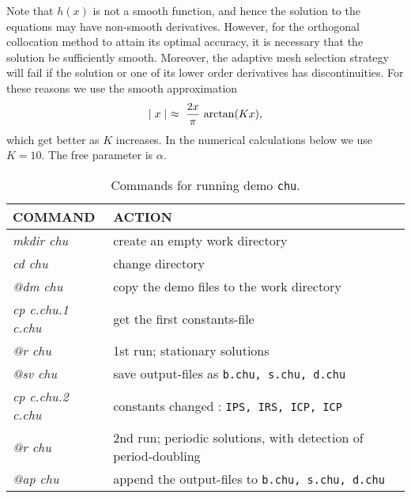 \documentclass[12pt]{report}
\def\abs#1{\mid#1\mid}
\begin{document}
Note that $h(x)$ is not a smooth function, and hence the solution 
to the equations  may have non-smooth derivatives.
However, for the orthogonal collocation method to attain its optimal accuracy,
it is necessary that the solution be sufficiently smooth.
Moreover, the adaptive mesh selection strategy will fail
if the solution or one of its lower order derivatives has discontinuities.
For these reasons  we use the smooth approximation
$$ \abs{x} ~\approx~ {2 x \over \pi } ~ {\rm arctan}(Kx),$$
which get better as $K$ increases.
In the numerical calculations below we use $K = 10$.
The free parameter is $\alpha$.


\begin{table}[htbp]
\begin{center}
\begin{tabular}{| l | l |}
\hline
  COMMAND  & ACTION \\
\hline
  {\it mkdir chu} & create an empty work directory \\ 
  {\it cd chu} & change directory \\
  {\it @dm chu} & copy the demo files to the work directory \\
\hline
  {\it cp c.chu.1 c.chu} & get the first constants-file \\ 
  {\it @r chu} & 1st run; stationary solutions \\ 
  {\it @sv chu} & save output-files as {\tt b.chu, s.chu, d.chu} \\ 
\hline
  {\it cp c.chu.2 c.chu} & constants changed : {\tt IPS, IRS, ICP, ICP} \\ 
  {\it @r chu} & 2nd run; periodic solutions, with detection of period-doubling \\ 
  {\it @ap chu} & append the output-files to {\tt b.chu, s.chu, d.chu} \\ 
\hline
\end{tabular}
\caption{Commands for running demo {\tt chu}.}
\label{tbl:demo_chu}
\end{center}
\end{table}

\newpage
\end{document}
